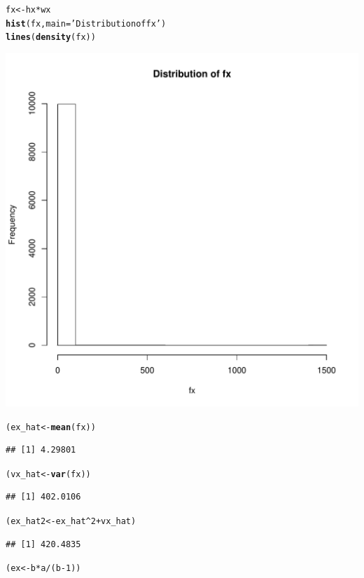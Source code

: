 \documentclass{article}\usepackage[]{graphicx}\usepackage[]{color}
\makeatletter
\def\maxwidth{ %
  \ifdim\Gin@nat@width>\linewidth
    \linewidth
  \else
    \Gin@nat@width
  \fi
}
\newcommand{\hlnum}[1]{\textcolor[rgb]{0.686,0.059,0.569}{#1}}%
\newcommand{\hlstr}[1]{\textcolor[rgb]{0.192,0.494,0.8}{#1}}%
\newcommand{\hlopt}[1]{\textcolor[rgb]{0,0,0}{#1}}%
\newcommand{\hlstd}[1]{\textcolor[rgb]{0.345,0.345,0.345}{#1}}%
\newcommand{\hlkwb}[1]{\textcolor[rgb]{0.69,0.353,0.396}{#1}}%
\newcommand{\hlkwc}[1]{\textcolor[rgb]{0.333,0.667,0.333}{#1}}%
\newcommand{\hlkwd}[1]{\textcolor[rgb]{0.737,0.353,0.396}{\textbf{#1}}}%
\newenvironment{kframe}{%
 \def\at@end@of@kframe{}%
 \ifinner\ifhmode%
  \def\at@end@of@kframe{\end{minipage}}%
  \begin{minipage}{\columnwidth}%
 \fi\fi%
 \def\FrameCommand##1{\hskip\@totalleftmargin \hskip-\fboxsep
 \colorbox{shadecolor}{##1}\hskip-\fboxsep
     \hskip-\linewidth \hskip-\@totalleftmargin \hskip\columnwidth}%
 \MakeFramed {\advance\hsize-\width
   \@totalleftmargin\z@ \linewidth\hsize
   \@setminipage}}%
 {\par\unskip\endMakeFramed%
 \at@end@of@kframe}
\newenvironment{knitrout}{}{} %
\makeatother
\begin{document}
\begin{knitrout}
\begin{kframe}
\begin{alltt}
\hlstd{fx} \hlkwb{<-} \hlstd{hx} \hlopt{*} \hlstd{wx}
\hlkwd{hist}\hlstd{(fx,}\hlkwc{main}\hlstd{=}\hlstr{'Distribution of fx'}\hlstd{)}
\hlkwd{lines}\hlstd{(}\hlkwd{density}\hlstd{(fx))}
\end{alltt}
\end{kframe}
\includegraphics[width=\maxwidth]{figure/unnamed-chunk-3-2} 
\begin{kframe}\begin{alltt}
\hlstd{(ex_hat} \hlkwb{<-} \hlkwd{mean}\hlstd{(fx))}
\end{alltt}
\begin{verbatim}
## [1] 4.29801
\end{verbatim}
\begin{alltt}
\hlstd{(vx_hat} \hlkwb{<-} \hlkwd{var}\hlstd{(fx))}
\end{alltt}
\begin{verbatim}
## [1] 402.0106
\end{verbatim}
\begin{alltt}
\hlstd{(ex_hat2} \hlkwb{<-} \hlstd{ex_hat}\hlopt{^}\hlnum{2}\hlopt{+}\hlstd{vx_hat)}
\end{alltt}
\begin{verbatim}
## [1] 420.4835
\end{verbatim}
\begin{alltt}
\hlstd{(ex} \hlkwb{<-} \hlstd{b}\hlopt{*}\hlstd{a}\hlopt{/}\hlstd{(b}\hlopt{-}\hlnum{1}\hlstd{))}

\end{alltt}
\end{kframe}
\end{knitrout}
\end{document}
